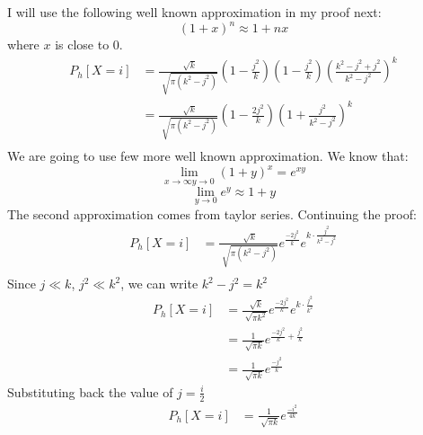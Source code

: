 \begin{solution}
	I will use the following well known approximation in my proof next:
	\[(1+x)^n \approx 1+nx\]
	where $x$ is close to 0.
	\begin{align}
		P_h[X=i] & = \frac{\sqrt[]{k}}{\sqrt[]{\pi (k^2-j^2)}}\left(1-\frac{j^2}{k}\right)\left(1-\frac{j^2}{k}\right)\left(\frac{k^2-j^2+j^2}{k^2-j^2}\right)^k\\
		& = \frac{\sqrt[]{k}}{\sqrt[]{\pi (k^2-j^2)}}\left(1-\frac{2j^2}{k}\right)\left(1+\frac{j^2}{k^2-j^2}\right)^k\\
	\end{align}
	We are going to use few more well known approximation. We know that:
	\[\lim_{x\to \infty y\to 0} (1+y)^x = e^{xy}\]
	\[\lim_{y\to 0}e^y \approx 1+y\]
	The second approximation comes from taylor series.
	Continuing the proof:
	\begin{align}
		P_h[X=i] & = \frac{\sqrt[]{k}}{\sqrt[]{\pi (k^2-j^2)}} e^{\frac{-2j^2}{k}}e^{k\cdot{\frac{j^2}{k^2-j^2}}}\\
	\end{align}
	Since $j\ll k$, $j^2 \ll k^2$, we can write $k^2-j^2=k^2$
	\begin{align}
		P_h[X=i] & = \frac{\sqrt[]{k}}{\sqrt[]{\pi k^2}}e^{\frac{-2j^2}{k}}e^{k\cdot{\frac{j^2}{k^2}}} \\
		& = \frac{1}{\sqrt[]{\pi k}}e^{\frac{-2j^2}{k}+\frac{j^2}{k}}\\
		& = \frac{1}{\sqrt[]{\pi k}}e^{\frac{-j^2}{k}}
	\end{align}
	Substituting back the value of $j = \frac{i}{2}$
	\begin{align}
		P_h[X=i] & = \frac{1}{\sqrt[]{\pi k}}e^{\frac{-i^2}{4k}}
	\end{align}
	
\end{solution}
